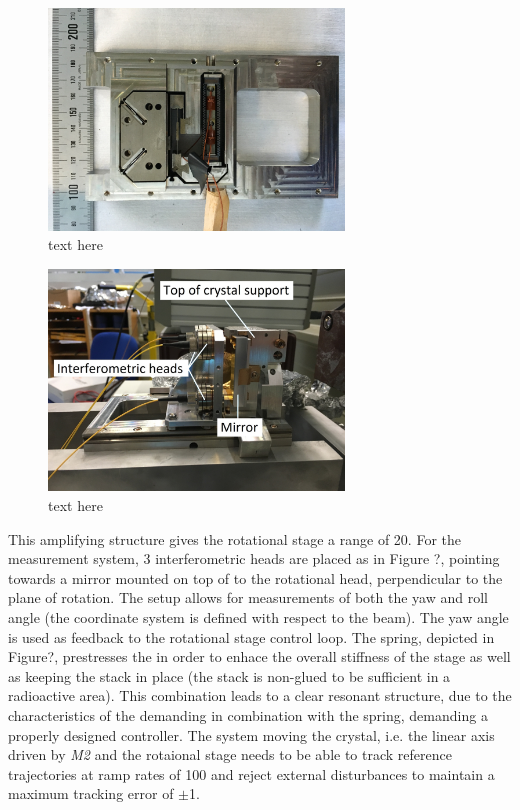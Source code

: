 \begin{figure}[h!]
  \centering
  \includegraphics[width=0.7\textwidth]{fig/rotational-stage.jpg}
  \caption{\label{fig:rotationalstage} text here}
\end{figure}

\begin{figure}[h!]
  \centering
  \includegraphics[width=0.7\textwidth]{fig/rotational-stage-interferometer.jpg}
  \caption{\label{fig:rotationalstage} text here}
\end{figure}

This amplifying structure gives the rotational stage a range of \unit{20}{\milli\rad}. For the measurement system, 3 interferometric heads are placed as in Figure ?, pointing towards a mirror mounted on top of to the rotational head, perpendicular to the plane of rotation. The setup allows for measurements of both the yaw and roll angle (the coordinate system is defined with respect to the beam). The yaw angle is used as feedback to the rotational stage control loop. The spring, depicted in Figure?, prestresses the \abbrPEA in order to enhace the overall stiffness of the stage as well as keeping the stack in place (the stack is non-glued to be sufficient in a radioactive area). This combination leads to a clear resonant structure, due to the characteristics of the \abbrPEA demanding in combination with the spring, demanding a properly designed controller. The system moving the crystal, i.e. the linear axis driven by \emph{M2} and the rotaional stage needs to be able to track reference trajectories at ramp rates of \unit{100}{\micro\radianpersecond} and reject external disturbances to maintain a maximum tracking error of $\pm$\unit{1}{\micro\rad}.

